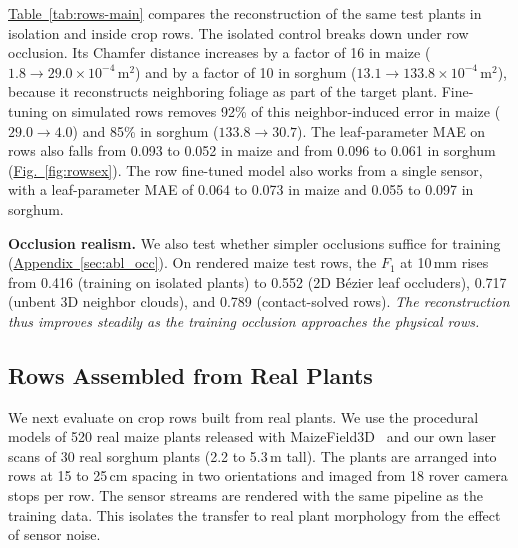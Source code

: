 \documentclass[10pt,twocolumn,letterpaper]{article}
\newcommand{\figref}[1]{\hyperref[#1]{Fig.~\ref*{#1}}}
\newcommand{\tabref}[1]{\hyperref[#1]{Table~\ref*{#1}}}
\newcommand{\appendixref}[1]{\hyperref[#1]{Appendix~\ref*{#1}}}
\begin{document}
\tabref{tab:rows-main} compares the reconstruction of the same test plants in isolation and inside crop rows. The isolated control breaks down under row occlusion. Its Chamfer distance increases by a factor of 16 in maize ($1.8 \to 29.0 \times 10^{-4}\,\mathrm{m}^2$) and by a factor of 10 in sorghum ($13.1 \to 133.8 \times 10^{-4}\,\mathrm{m}^2$), because it reconstructs neighboring foliage as part of the target plant. Fine-tuning on simulated rows removes 92\% of this neighbor-induced error in maize ($29.0 \to 4.0$) and 85\% in sorghum ($133.8 \to 30.7$). The leaf-parameter MAE on rows also falls from 0.093 to 0.052 in maize and from 0.096 to 0.061 in sorghum (\figref{fig:rowsex}). The row fine-tuned model also works from a single sensor, with a leaf-parameter MAE of 0.064 to 0.073 in maize and 0.055 to 0.097 in sorghum.

\noindent\textbf{Occlusion realism.}
We also test whether simpler occlusions suffice for training (\appendixref{sec:abl_occ}). On rendered maize test rows, the $F_1$ at 10\,mm rises from 0.416 (training on isolated plants) to 0.552 (2D B\'ezier leaf occluders), 0.717 (unbent 3D neighbor clouds), and 0.789 (contact-solved rows). \textit{The reconstruction thus improves steadily as the training occlusion approaches the physical rows.}

\subsection{Rows Assembled from Real Plants}
\label{sec:res-field}\label{sec:exp-real}

We next evaluate on crop rows built from real plants. We use the procedural models of 520 real maize plants released with MaizeField3D~\citep{maizefield3d2025} and our own laser scans of 30 real sorghum plants (2.2 to 5.3\,m tall). The plants are arranged into rows at 15 to 25\,cm spacing in two orientations and imaged from 18 rover camera stops per row. The sensor streams are rendered with the same pipeline as the training data. This isolates the transfer to real plant morphology from the effect of sensor noise.
\end{document}
